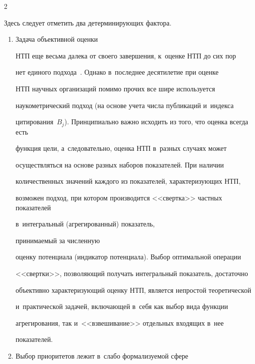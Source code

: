 \begin{multicols}{2}
    \vspace*{-2pt}

    

    \noindent

     Здесь следует отметить два детерминирующих фактора. 

\begin{enumerate}[1.]

\item Задача объективной оценки 

НТП еще весьма далека от своего завершения, к~оценке НТП до сих пор 

нет единого подхода~\cite{10-sun}. Однако в~последнее десятилетие при оценке 

НТП научных организаций помимо прочих все шире используется 

наукометрический подход (на основе учета числа пуб\-ли\-ка\-ций и~индекса

цитирования~$B_j$). Принципиально важно исходить из того, что оценка всегда есть 

функция цели, а~следовательно, оценка НТП в~разных случаях может 

осуществляться на основе разных наборов показателей. При наличии 

количественных значений каж\-до\-го из показателей, характеризующих НТП, 

возможен подход, при котором производится <<свертка>> част\-ных показателей 

в~интегральный (агрегированный) показатель,\linebreak

 принимаемый за численную 

оценку потенциала (индикатор потенциала). Выбор оптимальной операции 

<<свертки>>, позволяющий получать интегральный показатель, достаточно\linebreak 

объективно ха\-рак\-те\-ри\-зу\-ющий оценку НТП, является непростой теоретической 

и~практической задачей, включающей в~себя как выбор вида функции 

агрегирования, так и~<<взвешивание>> отдельных входящих в~нее 

показателей.\\[-14pt] 

    

    \item Выбор приоритетов лежит в~слабо формализуемой сфере 


\end{enumerate}
\end{multicols}
